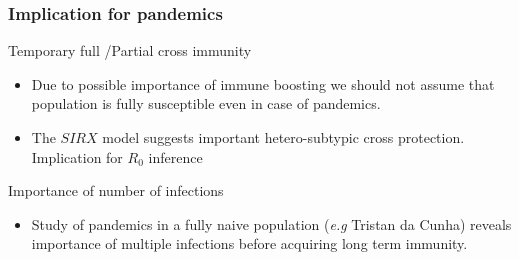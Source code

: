 \documentclass{beamer}
\begin{document}
\begin{frame}
  \frametitle{Implication for pandemics}
  
  \begin{block}{Temporary full /Partial cross immunity}
    \begin{itemize}
    \item Due to possible importance of immune boosting we should not
      assume that population is fully susceptible even in case of
      pandemics.
    \item The $SIRX$ model suggests important hetero-subtypic cross
      protection. \alert{Implication for $R_0$ inference}
    \end{itemize}
  \end{block}

\pause

  \begin{alertblock}{Importance of number of infections}
    \begin{itemize}
    \item Study of pandemics in a fully naive population (\textit{e.g}
      Tristan da Cunha) reveals importance of multiple infections
      before acquiring long term immunity.
    \end{itemize} 
  \end{alertblock}
  

\end{frame}
\end{document}
